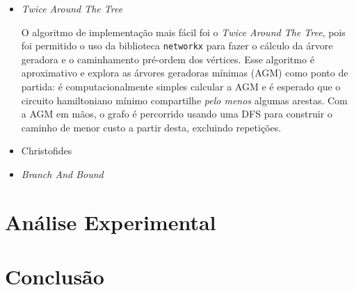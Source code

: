 \documentclass{article}
\begin{document}
\begin{itemize}

	\item \textit{Twice Around The Tree}

	      O algoritmo de implementação mais fácil foi o \textit{Twice Around The Tree}, pois foi permitido o uso da biblioteca \texttt{networkx} para fazer o cálculo da árvore geradora e o caminhamento pré-ordem dos vértices. Esse algoritmo é aproximativo e explora as árvores geradoras mínimas (AGM) como ponto de partida: é computacionalmente simples calcular a AGM e é esperado que o circuito hamiltoniano mínimo compartilhe \textit{pelo menos} algumas arestas. Com a AGM em mãos, o grafo é percorrido usando uma DFS para construir o caminho de menor custo a partir desta, excluindo repetições.

	\item Christofides

	\item \textit{Branch And Bound}

\end{itemize}

\section{Análise Experimental}

\section{Conclusão}

\end{document}
